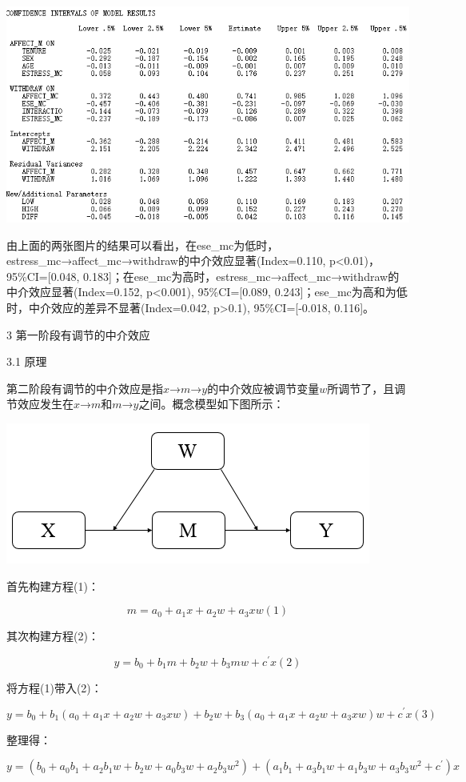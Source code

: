 \documentclass[
]{book}
\begin{document}
\includegraphics{figs/1148.png}

由上面的两张图片的结果可以看出，在ese\_mc为低时，estress\_mc→affect\_mc→withdraw的中介效应显著(Index=0.110, p\textless0.01)，95\%CI={[}0.048, 0.183{]}；在ese\_mc为高时，estress\_mc→affect\_mc→withdraw的中介效应显著(Index=0.152, p\textless0.001), 95\%CI={[}0.089, 0.243{]}；ese\_mc为高和为低时，中介效应的差异不显著(Index=0.042, p\textgreater0.1), 95\%CI={[}-0.018, 0.116{]}。

3 第一阶段有调节的中介效应

3.1 原理

第二阶段有调节的中介效应是指\(x\)→\(m\)→\(y\)的中介效应被调节变量\(w\)所调节了，且调节效应发生在\(x\)→\(m\)和\(m\)→\(y\)之间。概念模型如下图所示：

\includegraphics{figs/1149.png}

首先构建方程(1)：

\[
m=a_{0}+a_{1}x+a_{2}w+a_{3}xw(1)
\]

其次构建方程(2)：

\[
y=b_{0}+b_{1}m+b_{2}w+b_{3}mw+c^{'}x(2)
\]

将方程(1)带入(2)：

\[
y=b_{0}+b_{1}(a_{0}+a_{1}x+a_{2}w+a_{3}xw)+b_{2}w+b_{3}(a_{0}+a_{1}x+a_{2}w+a_{3}xw)w+c^{'}x(3)
\]

整理得：

\[
y=(b_{0}+a_{0}b_{1}+a_{2}b_{1}w+b_{2}w+a_{0}b_{3}w+a_{2}b_{3}w^{2})+(a_{1}b_{1}+a_{3}b_{1}w+a_{1}b_{3}w+a_{3}b_{3}w^{2}+c^{'})x
\]
\end{document}
